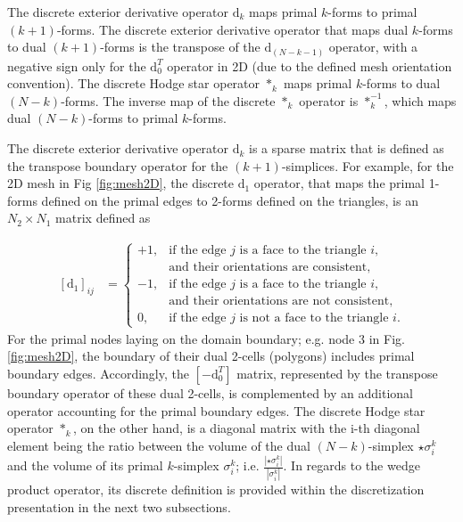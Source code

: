 \documentclass[final,12pt,times]{elsarticle}
\begin{document}
The discrete exterior derivative operator $\textrm{d}_k$ maps primal $k$-forms to primal $(k+1)$-forms. The discrete exterior derivative operator that maps dual $k$-forms to dual $(k+1)$-forms is the transpose of the $\textrm{d}_{(N-k-1)}$ operator, with a negative sign only for the $\textrm{d}_0^T$ operator in 2D (due to the defined mesh orientation convention). The discrete Hodge star operator $\ast_k$ maps primal $k$-forms to dual $(N-k)$-forms. The inverse map of the discrete $\ast_k$ operator is $\ast^{-1}_k$, which maps dual $(N-k)$-forms to primal $k$-forms. 

The discrete exterior derivative operator $\textrm{d}_k$ is a sparse matrix that is defined as the transpose boundary operator for the $(k+1)$-simplices. For example, for the 2D mesh in Fig \ref{fig:mesh2D}, the discrete $\textrm{d}_1$ operator, that maps the primal 1-forms defined on the primal edges to 2-forms defined on the triangles, is an $N_2 \times N_1$ matrix defined as

\begin{equation}
\label{eq:d1-matrix}
\begin{aligned}
\left[ \textrm{d}_1 \right]_{ij} &=\begin{cases}
    +1, & \text{if the edge $j$ is a face to the triangle $i$,} \\ &\text{and their orientations are consistent},\\
    -1, & \text{if the edge $j$ is a face to the triangle $i$,} \\ &\text{and their orientations are not consistent}, \\
     0, & \text{if the edge $j$ is not a face to the triangle $i$}.
  \end{cases}   
\end{aligned}
\end{equation}
For the primal nodes laying on the domain boundary; e.g. node 3 in Fig. \ref{fig:mesh2D}, the boundary of their dual 2-cells (polygons) includes primal boundary edges. Accordingly, the $[-\textrm{d}_0^T]$ matrix, represented by the transpose boundary operator of these dual 2-cells, is complemented by an additional operator accounting for the primal boundary edges. The discrete Hodge star operator $\ast_k$, on the other hand, is a diagonal matrix with the i-th diagonal element being the ratio between the volume of the dual $(N-k)$-simplex $\star \sigma^k_i$ and the volume of its primal $k$-simplex $\sigma^k_i$; i.e. $\frac{|\star \sigma^k_i|}{|\sigma^k_i|}$. In regards to the wedge product operator, its discrete definition is provided within the discretization presentation in the next two subsections.       
\end{document}
